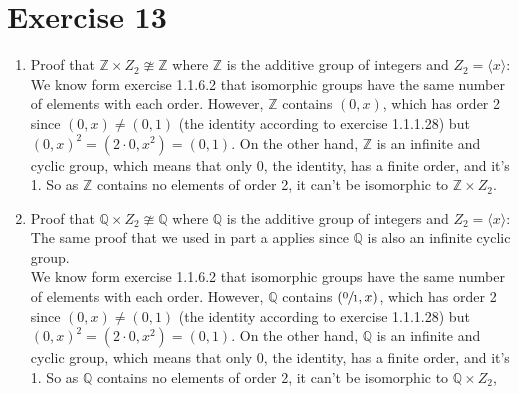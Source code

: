 \documentclass[12pt]{article}
\newcommand{\Z}{\mathbb{Z}}
\newcommand{\Q}{\mathbb{Q}}
\begin{document}
    \section*{Exercise 13}
    \begin{enumerate}[label=\textbf{\alph*.}]
        \item 
            Proof that $\Z \times Z_2 \ncong \Z$
            where $\Z$ is the additive group of integers
            and $Z_2 = \langle x \rangle$: \\
            We know form exercise 1.1.6.2 that isomorphic
            groups have the same number of elements with each order.
            However, $\Z$ contains $(0, x)$, which has order 2
            since $(0, x) \neq (0, 1)$
            (the identity according to exercise 1.1.1.28)
            but $(0, x)^2 = (2 \cdot 0, x^2) = (0, 1)$.
            On the other hand, $\Z$ is an infinite and cyclic
            group, which means that only 0, the identity,
            has a finite order, and it's 1.
            So as $\Z$ contains no elements of order 2,
            it can't be isomorphic to $\Z \times Z_2$.
        \item
            Proof that $\Q \times Z_2 \ncong \Q$
            where $\Q$ is the additive group of integers
            and $Z_2 = \langle x \rangle$: \\
            The same proof that we used in part a applies
            since $\Q$ is also an infinite cyclic group. \\
            We know form exercise 1.1.6.2 that isomorphic
            groups have the same number of elements with each order.
            However, $\Q$ contains $(\sfrac{0}{1}, x)$,
            which has order 2
            since $(0, x) \neq (0, 1)$
            (the identity according to exercise 1.1.1.28)
            but $(0, x)^2 = (2 \cdot 0, x^2) = (0, 1)$.
            On the other hand, $\Q$ is an infinite and cyclic
            group, which means that only 0, the identity,
            has a finite order, and it's 1.
            So as $\Q$ contains no elements of order 2,
            it can't be isomorphic to $\Q \times Z_2$,
    \end{enumerate}
\end{document}
